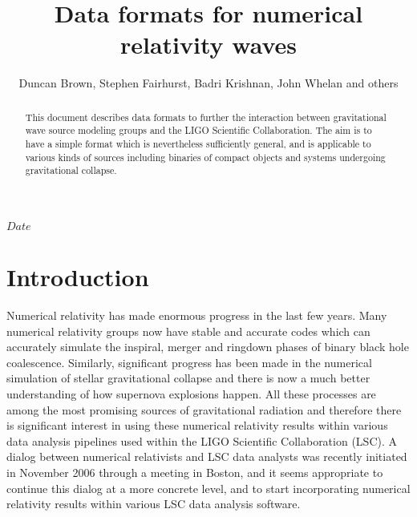 \documentclass[10pt]{ligodcc}
\title{Data formats for numerical relativity waves}
\author{Duncan Brown, Stephen Fairhurst, Badri Krishnan, John Whelan and others}
\begin{document}
\maketitle


\tableofcontents

\newcommand{\Ys}{{{}^sY}}
\newcommand{\Ytwo}{{{}^{-2}Y}}
\newcommand{\tens}[1]{\overleftrightarrow{#1}}
\newcommand{\xhat}{\vec{e}_x}
\newcommand{\yhat}{\vec{e}_y}
\newcommand{\zhat}{\vec{e}_z}
\newcommand{\ihat}{\vec{e}_i}
\newcommand{\jhat}{\vec{e}_j}
\newcommand{\rhat}{\vec{e}_{r}}
\newcommand{\that}{\vec{e}_{t}}
\newcommand{\iotahat}{\vec{e}_{\iota}}
\newcommand{\phihat}{\vec{e}_{\phi}}
\newcommand{\eplus}{\tens{e}_+}
\newcommand{\ecross}{\tens{e}_\times}

\newcommand{\ellhat}{\vec{\ell}}
\newcommand{\nhat}{\vec{n}}
\newcommand{\mhat}{\vec{m}}
\newcommand{\mbarhat}{\vec{\bar{m}}}

\RCS $Date$
\date{\RCSDate}

\begin{abstract}
  This document describes data formats to further the interaction
  between gravitational wave source modeling groups and the LIGO
  Scientific Collaboration. The aim is to have a simple format which
  is nevertheless sufficiently general, and is applicable to various
  kinds of sources including binaries of compact objects and systems
  undergoing gravitational collapse.
\end{abstract}

\section{Introduction}
\label{sec:intro}

Numerical relativity has made enormous progress in the last few years.
Many numerical relativity groups now have stable and accurate codes
which can accurately simulate the inspiral, merger and ringdown phases
of binary black hole coalescence.  Similarly, significant progress has
been made in the numerical simulation of stellar gravitational
collapse and there is now a much better understanding of how supernova
explosions happen.  All these processes are among the most promising
sources of gravitational radiation and therefore there is significant
interest in using these numerical relativity results within various
data analysis pipelines used within the LIGO Scientific Collaboration
(LSC).  A dialog between numerical relativists and LSC data
analysts was recently initiated in November 2006 through a meeting in
Boston, and it seems appropriate to continue this dialog at a more
concrete level, and to start incorporating numerical relativity
results within various LSC data analysis software.
\end{document}
